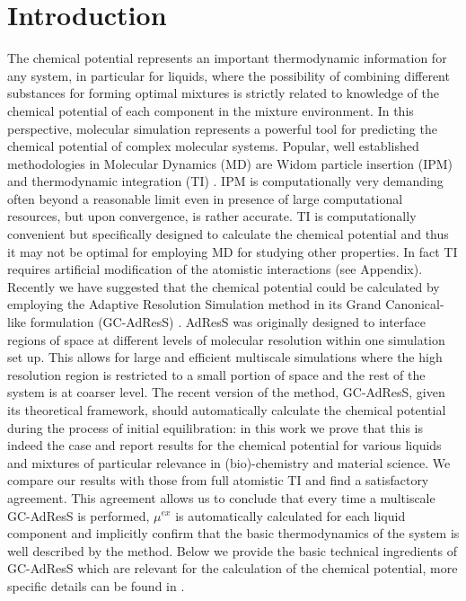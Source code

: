 \documentclass[a4paper,preprint,unsortedaddress]{revtex4-1}
\begin{document}
\section{Introduction}
The chemical potential represents an important thermodynamic information for any system, in particular for liquids, where the possibility of combining different substances for forming optimal mixtures is strictly related to knowledge of the chemical potential of each component in the mixture environment. In this perspective, molecular simulation represents a powerful tool for predicting the chemical potential of complex molecular systems. Popular, well established methodologies in Molecular Dynamics (MD) are Widom particle insertion (IPM) \cite{widom} and thermodynamic integration (TI) \cite{ti}. IPM is computationally very demanding often beyond a reasonable limit even in presence of large computational resources, but upon convergence, is rather accurate. TI is computationally convenient but specifically designed to calculate the chemical potential and thus  it may not be optimal for employing MD for studying other properties. In fact TI requires artificial modification of the atomistic interactions (see Appendix).
Recently we have suggested that the chemical potential could be calculated by employing the Adaptive Resolution Simulation method in its Grand Canonical-like formulation (GC-AdResS) \cite{prl12,jctchan,prx}.
AdResS was originally designed  to interface regions of space at different levels of molecular resolution within one simulation set up. This allows for large and efficient multiscale simulations where the high resolution region is restricted to a small portion of space and the rest of the system is at coarser level. The recent version of the method, GC-AdResS, given its theoretical framework, should automatically calculate the chemical potential during the process of initial equilibration: in this work we prove that this is indeed the case and report results for the chemical potential for various liquids and mixtures of particular relevance in (bio)-chemistry and material science. We compare our results with those from full atomistic TI and find a satisfactory agreement. This agreement allows us to conclude that every time a multiscale GC-AdResS is performed, $\mu^{ex}$ is automatically calculated for each liquid component and implicitly confirm that the basic thermodynamics of the system is well described by the method.
Below we provide the basic technical ingredients of GC-AdResS which are relevant for the calculation of the chemical potential, more specific details can be found in \cite{jctchan, prx}.
\end{document}
